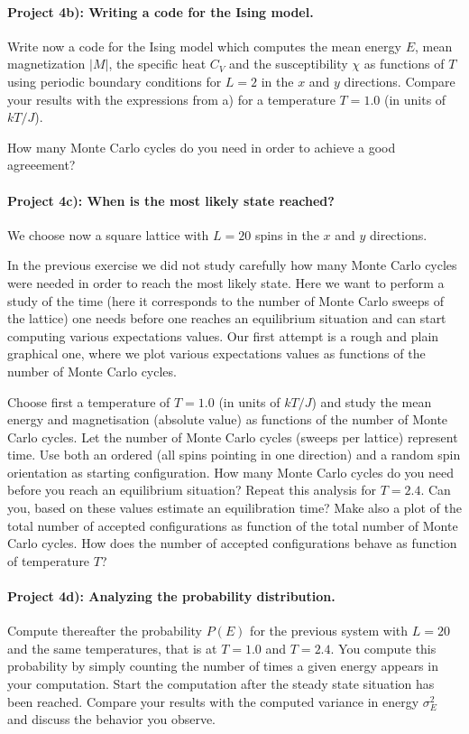 \documentclass[%
oneside,                 %
final,                   %
10pt]{article}
\begin{document}
\paragraph{Project 4b): Writing a code for the Ising model.}
Write now a code for the Ising model which computes the mean energy 
$E$, mean magnetization 
$\vert M\vert$, the specific heat $C_V$ and the susceptibility $\chi$ 
as functions of  $T$ using periodic boundary conditions for 
$L=2$ in the $x$ and $y$ directions. 
Compare your results with the expressions from a)
for  a  temperature $T=1.0$ (in units of $kT/J$). 

How many Monte Carlo cycles do you need in order to achieve a 
good agreeement?

\paragraph{Project 4c): When is the most likely state reached?}
We choose now a square lattice with $L=20$ spins in the $x$ and $y$ directions. 

In the previous exercise  we did not study carefully how many Monte Carlo cycles were needed in order to reach the most likely state. Here
we want to perform a study of the time (here it corresponds to the number 
of Monte Carlo sweeps of the lattice) one needs before one reaches an equilibrium situation 
and can start computing various expectations values. Our 
first attempt is a rough and plain graphical
one, where we plot various expectations values as functions of the number of Monte Carlo cycles.

Choose first a temperature of $T=1.0$ (in units of $kT/J$) and study the 
mean energy and magnetisation (absolute value) as functions of the number of Monte Carlo cycles. Let the number of Monte Carlo cycles (sweeps per lattice)
represent time.
Use both an ordered (all spins pointing in one direction) and a random
spin orientation as starting configuration. 
How many Monte Carlo cycles do you need before you reach an equilibrium situation?
Repeat this analysis for $T=2.4$. 
Can you, based on these values estimate an equilibration time?
Make also a plot of the total number of accepted configurations 
as function of the total number of Monte Carlo cycles. How does the number of
accepted configurations behave as function of temperature $T$?

\paragraph{Project 4d): Analyzing the probability distribution.}
Compute thereafter the probability
$P(E)$ for the previous system with $L=20$ and the same temperatures, that is at $T=1.0$ and $T=2.4$.
You compute this probability by simply counting the number of times a 
given energy appears in your computation. Start the computation after 
the steady state situation has been reached.
Compare your results with the computed variance in energy 
$\sigma^2_E$ and discuss the behavior you observe. 
\end{document}
